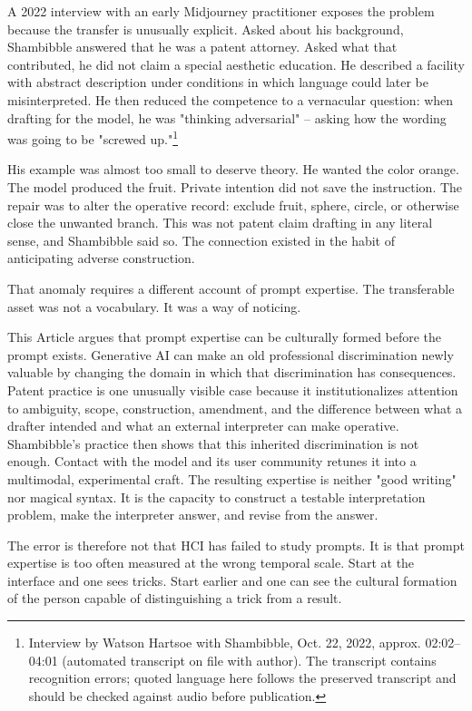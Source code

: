\documentclass[11pt]{article}
\begin{document}
A 2022 interview with an early Midjourney practitioner exposes the problem because the transfer is unusually explicit. Asked about his background, Shambibble answered that he was a patent attorney. Asked what that contributed, he did not claim a special aesthetic education. He described a facility with abstract description under conditions in which language could later be misinterpreted. He then reduced the competence to a vernacular question: when drafting for the model, he was "thinking adversarial" -- asking how the wording was going to be "screwed up."\footnote{Interview by Watson Hartsoe with Shambibble, Oct. 22, 2022, approx. 02:02--04:01 (automated transcript on file with author). The transcript contains recognition errors; quoted language here follows the preserved transcript and should be checked against audio before publication.}

His example was almost too small to deserve theory. He wanted the color orange. The model produced the fruit. Private intention did not save the instruction. The repair was to alter the operative record: exclude fruit, sphere, circle, or otherwise close the unwanted branch. This was not patent claim drafting in any literal sense, and Shambibble said so. The connection existed in the habit of anticipating adverse construction.

That anomaly requires a different account of prompt expertise. The transferable asset was not a vocabulary. It was a way of noticing.

This Article argues that prompt expertise can be culturally formed before the prompt exists. Generative AI can make an old professional discrimination newly valuable by changing the domain in which that discrimination has consequences. Patent practice is one unusually visible case because it institutionalizes attention to ambiguity, scope, construction, amendment, and the difference between what a drafter intended and what an external interpreter can make operative. Shambibble's practice then shows that this inherited discrimination is not enough. Contact with the model and its user community retunes it into a multimodal, experimental craft. The resulting expertise is neither "good writing" nor magical syntax. It is the capacity to construct a testable interpretation problem, make the interpreter answer, and revise from the answer.

The error is therefore not that HCI has failed to study prompts. It is that prompt expertise is too often measured at the wrong temporal scale. Start at the interface and one sees tricks. Start earlier and one can see the cultural formation of the person capable of distinguishing a trick from a result.
\end{document}
